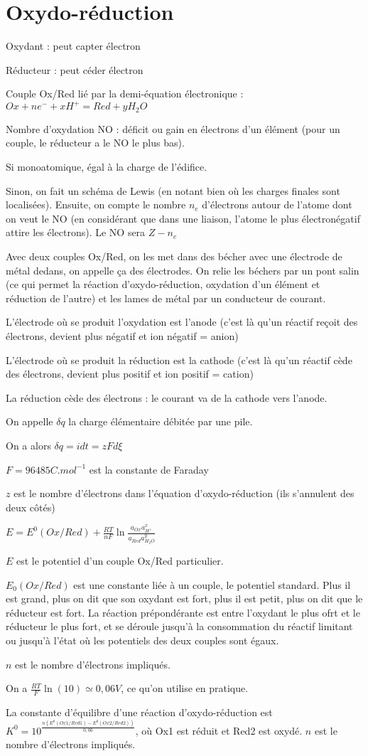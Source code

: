 \documentclass[a4paper,12pt]{book}
\newcommand{\Def}[2]{\begin{tcolorbox}[colback=white,colframe=red!10!green!20!blue!75!, title=Définition : #1]#2\end{tcolorbox}}
\newcommand{\Thr}[2]{\begin{tcolorbox}[sharp corners, colback=white,colframe=red!10!blue!30!green!75!, title=Théorème : #1]#2\end{tcolorbox}}
\newcommand{\Meth}[2]{\begin{tcolorbox}[colback=white,colframe=green!60!green!30!black!75, title=Méthode :  #1]#2\end{tcolorbox}}
\begin{document}
\section{Oxydo-réduction}
\Def{}{Oxydant : peut capter électron
\par Réducteur : peut céder électron
\par Couple Ox/Red lié par la demi-équation électronique : $Ox + ne^- +xH^+= Red + yH_2O$
\par Nombre d'oxydation NO : déficit ou gain en électrons d'un élément (pour un couple, le réducteur a le NO le plus bas).}
\Meth{Déterminer le NO}{Si monoatomique, égal à la charge de l'édifice.
\par Sinon, on fait un schéma de Lewis (en notant bien où les charges finales sont localisées). Ensuite, on compte le nombre $n_e$ d'électrons autour de l'atome dont on veut le NO (en considérant que dans une liaison, l'atome le plus électronégatif attire les électrons). Le NO sera $Z-n_e$}
\Def{Pile}{Avec deux couples Ox/Red, on les met dans des bécher avec une électrode de métal dedans, on appelle ça des électrodes. On relie les béchers par un pont salin (ce qui permet la réaction d'oxydo-réduction, oxydation d'un élément et réduction de l'autre) et les lames de métal par un conducteur de courant.
\par L'électrode où se produit l'oxydation est l'anode (c'est là qu'un réactif reçoit des électrons, devient plus négatif et ion négatif = anion)
\par L'électrode où se produit la réduction est la cathode (c'est là qu'un réactif cède des électrons, devient plus positif et ion positif = cation)
\par La réduction cède des électrons : le courant va de la cathode vers l'anode.
\par On appelle $\delta q$ la charge élémentaire débitée par une pile.
\par On a alors $\delta q = idt = zFd\xi$
\par $F = 96485 C.mol^{-1}$ est la constante de Faraday
\par $z$ est le nombre d'électrons dans l'équation d'oxydo-réduction (ils s'annulent des deux côtés)}
\Thr{Nernst}{$E = E^0(Ox/Red) + \frac{RT}{nF}\ln \frac{a_{Ox}a_{H^+}^x}{a_{Red}a_{H_2O}^y}$
\par $E$ est le potentiel d'un couple Ox/Red particulier.
\par $E_0(Ox/Red)$ est une constante liée à un couple, le potentiel standard. Plus il est grand, plus on dit que son oxydant est fort, plus il est petit, plus on dit que le réducteur est fort. La réaction prépondérante est entre l'oxydant le plus ofrt et le réducteur le plus fort, et se déroule jusqu'à la consommation du réactif limitant ou jusqu'à l'état où les potentiels des deux couples sont égaux.
\par $n$ est le nombre d'électrons impliqués.
\par On a $\frac{RT}{F}\ln(10)\simeq 0,06 V$, ce qu'on utilise en pratique.
\par La constante d'équilibre d'une réaction d'oxydo-réduction est $K^0 = 10^{\frac{n(E^0(Ox1/Red1)-E^0(Ox2/Red2))}{0,06}}$, où Ox1 est réduit et Red2 est oxydé. $n$ est le nombre d'électrons impliqués.}
\end{document}

